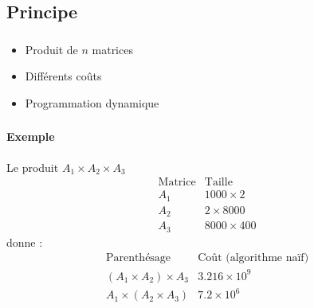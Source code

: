 \documentclass{beamer}
\begin{document}
\subsection{Principe}
\begin{frame}
  \frametitle{\insertsubsection}
  \begin{itemize}
  \item Produit de $n$ matrices
  \item Différents coûts
  \item Programmation dynamique
  \end{itemize}





\end{frame}

\begin{frame}
  \frametitle{\insertsubsection}
  \framesubtitle{Exemple}
  Le produit $A_1 \times A_2 \times A_3$
  \[
  \begin{array}{cc} 
    \mbox{Matrice} & \mbox{Taille}\\
    A_1 & 1000 \times 2\\
    A_2 & 2 \times 8000\\
    A_3 & 8000 \times 400
  \end{array}
  \]
  donne :
  \[
  \begin{array}{cc}
    \mbox{Parenthésage} & \mbox{Coût (algorithme naïf)}\\
    (A_1 \times A_2) \times A_3 & 3.216 \times 10^9\\
    A_1 \times (A_2 \times A_3) & 7.2 \times 10^6
  \end{array}
  \]
\end{frame}
\end{document}
